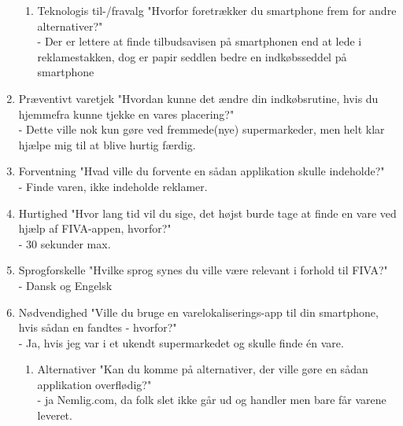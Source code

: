 \documentclass[a4paper,11pt]{report}
\begin{document}
\begin{enumerate}
\begin{enumerate}
\item Teknologis til-/fravalg "Hvorfor foretrækker du smartphone frem for andre alternativer?"\\
  - Der er lettere at finde tilbudsavisen på smartphonen end at lede i reklamestakken, dog er papir seddlen bedre en indkøbsseddel på smartphone
\end{enumerate}

\item Præventivt varetjek "Hvordan kunne det ændre din indkøbsrutine, hvis du hjemmefra kunne tjekke en vares placering?"\\
  - Dette ville nok kun gøre ved fremmede(nye) supermarkeder, men helt klar hjælpe mig til at blive hurtig færdig.
\item Forventning "Hvad ville du forvente en sådan applikation skulle indeholde?"\\
  - Finde varen, ikke indeholde reklamer.
\item Hurtighed	"Hvor lang tid vil du sige, det højst burde tage at finde en vare ved hjælp af FIVA-appen, hvorfor?"\\
  - 30 sekunder max.
\item Sprogforskelle "Hvilke sprog synes du ville være relevant i forhold til FIVA?"\\
  - Dansk og Engelsk
\item Nødvendighed "Ville du bruge en varelokaliserings-app til din smartphone, hvis sådan en fandtes - hvorfor?"\\
  - Ja, hvis jeg var i et ukendt supermarkedet og skulle finde én vare.
\begin{enumerate}
\item Alternativer "Kan du komme på alternativer, der ville gøre en sådan applikation overflødig?"\\
  - ja Nemlig.com, da folk slet ikke går ud og handler men bare får varene leveret.
\end{enumerate}

\end{enumerate}
\end{document}
